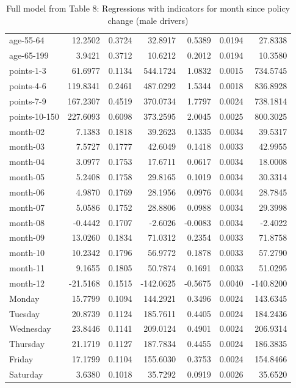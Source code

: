 \documentclass[10pt]{article}
\begin{document}
\begin{table}[ht]
\begin{tabular}{lrrrrrr}
  age-55-64 & 12.2502 & 0.3724 & 32.8917 & 0.5389 & 0.0194 & 27.8338 \\ 
  age-65-199 & 3.9421 & 0.3712 & 10.6212 & 0.2012 & 0.0194 & 10.3580 \\ 
  points-1-3 & 61.6977 & 0.1134 & 544.1724 & 1.0832 & 0.0015 & 734.5745 \\ 
  points-4-6 & 119.8341 & 0.2461 & 487.0292 & 1.5344 & 0.0018 & 836.8928 \\ 
  points-7-9 & 167.2307 & 0.4519 & 370.0734 & 1.7797 & 0.0024 & 738.1814 \\ 
  points-10-150 & 227.6093 & 0.6098 & 373.2595 & 2.0045 & 0.0025 & 800.3025 \\ 
  month-02 & 7.1383 & 0.1818 & 39.2623 & 0.1335 & 0.0034 & 39.5317 \\ 
  month-03 & 7.5727 & 0.1777 & 42.6049 & 0.1418 & 0.0033 & 42.9955 \\ 
  month-04 & 3.0977 & 0.1753 & 17.6711 & 0.0617 & 0.0034 & 18.0008 \\ 
  month-05 & 5.2408 & 0.1758 & 29.8165 & 0.1019 & 0.0034 & 30.3314 \\ 
  month-06 & 4.9870 & 0.1769 & 28.1956 & 0.0976 & 0.0034 & 28.7845 \\ 
  month-07 & 5.0586 & 0.1752 & 28.8806 & 0.0988 & 0.0034 & 29.3998 \\ 
  month-08 & -0.4442 & 0.1707 & -2.6026 & -0.0083 & 0.0034 & -2.4022 \\ 
  month-09 & 13.0260 & 0.1834 & 71.0312 & 0.2354 & 0.0033 & 71.8758 \\ 
  month-10 & 10.2342 & 0.1796 & 56.9772 & 0.1878 & 0.0033 & 57.2790 \\ 
  month-11 & 9.1655 & 0.1805 & 50.7874 & 0.1691 & 0.0033 & 51.0295 \\ 
  month-12 & -21.5168 & 0.1515 & -142.0625 & -0.5675 & 0.0040 & -140.8200 \\ 
  Monday & 15.7799 & 0.1094 & 144.2921 & 0.3496 & 0.0024 & 143.6345 \\ 
  Tuesday & 20.8739 & 0.1124 & 185.7611 & 0.4405 & 0.0024 & 184.2436 \\ 
  Wednesday & 23.8446 & 0.1141 & 209.0124 & 0.4901 & 0.0024 & 206.9314 \\ 
  Thursday & 21.1719 & 0.1127 & 187.7834 & 0.4455 & 0.0024 & 186.3835 \\ 
  Friday & 17.1799 & 0.1104 & 155.6030 & 0.3753 & 0.0024 & 154.8466 \\ 
  Saturday & 3.6380 & 0.1018 & 35.7292 & 0.0919 & 0.0026 & 35.6520 \\ 
   \hline
\end{tabular}
\caption{Full model from Table 8: Regressions with indicators for month since policy change (male drivers)} 
\label{tab_8_all_pts_no_age_M}
\end{table}
\end{document}
